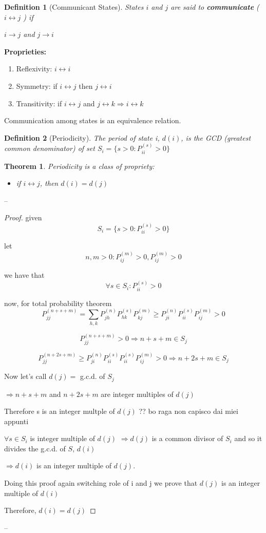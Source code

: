 \documentclass[a4paper,12pt]{report}
\newtheorem{theorem}{Theorem}[section]
\newtheorem{definition}{Definition}
\begin{document}
\begin{definition}[Communicant States] 

States $i$ and $j$ are said to {\bfseries communicate} ( $ i \leftrightarrow j$ ) if 

 $i \rightarrow j$ and $j \rightarrow i$
\end{definition}

{\bfseries Proprieties:}
\begin{enumerate}
\item Reflexivity: \quad $i \leftrightarrow i$
\item Symmetry: \quad if $i \leftrightarrow j$ then $j \leftrightarrow i$
\item Transitivity: \quad if $i \leftrightarrow j$ and $j \leftrightarrow k \Rightarrow i \leftrightarrow k$
 \end{enumerate}
Communication among states is an equivalence relation.

\begin{definition}[Periodicity]
The period of state i, $d(i)$, is the GCD (greatest common denominator) of set $S_i = \{ s>0 : P_{ii}^{(s)} >0 \}$
\end{definition}

\begin{theorem} Periodicity is a class of propriety: 
\begin{itemize} 
\item if $i \leftrightarrow j$, then $d(i) = d(j)$ 
\end{itemize}
\end{theorem}
--
\begin{proof}
given $$S_i = \{ s>0 : P_{ii}^{(s)} >0 \}$$

let $$n, m >0 : P_{ij}^{(m)} >0, P_{ij}^{(m)} > 0$$

we have that $$\forall s \in S_i : P_{ii}^{(s)} > 0$$

now, for total probability theorem$$P_{jj}^{(n+s+m)} = \sum_{h, k} P_{jh}^{(n)} P_{hk}^{(s)} P_{kj}^{(m)} \geq P_{ji}^{(n)} P_{ii}^{(s)} P_{ij}^{(m)} >0 $$

$$P_{jj}^{(n+s+m)} >0 \Rightarrow n+s+m \in S_j$$

$$P_{jj}^{(n+2s+m)} \geq P_{ji}^{(n)} P_{ii}^{(s)} P_{ii}^{(s)} P_{ij}^{(m)} >0 \Rightarrow n+2s+m \in S_j$$

Now let's call $d(j) =$ g.c.d. of $S_j$ 

$ \Rightarrow n+s+m$ and $n+2s+m$ are integer multiples of $d(j)$

Therefore s is an integer multple of $d(j)$ ?? bo raga non capisco dai miei appunti

$\forall s \in S_i$ is integer multiple of $d(j)$ $\Rightarrow d(j)$ is a common divisor of $S_i$ and so it divides the g.c.d. of $S$, $d(i)$

$\Rightarrow d(i)$ is an integer multiple of $d(j)$.

Doing this proof again switching role of i and j we prove that $d(j)$ is an integer multiple of $d(i)$

Therefore, $d(i) = d(j)$

\end{proof}
--
\end{document}
